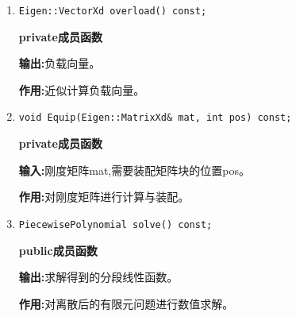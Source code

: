 \documentclass[UTF8]{ctexart}
\theoremstyle{plain}
\theoremstyle{definition}
\theoremstyle{remark}
\begin{document}
\begin{itemize}
\begin{enumerate}
        \item \texttt{Eigen::VectorXd overload() const;}

        \textbf{private成员函数}

        \textbf{输出:}负载向量。

        \textbf{作用:}近似计算负载向量。

        \item \texttt{void Equip(Eigen::MatrixXd\& mat, int pos) const;}
        
        \textbf{private成员函数}
        
        \textbf{输入:}刚度矩阵mat,需要装配矩阵块的位置pos。

        \textbf{作用:}对刚度矩阵进行计算与装配。

        \item \texttt{PiecewisePolynomial solve() const;}
        
        \textbf{public成员函数}
        
        \textbf{输出:}求解得到的分段线性函数。

        \textbf{作用:}对离散后的有限元问题进行数值求解。
    \end{enumerate}
\end{itemize}
\end{document}
